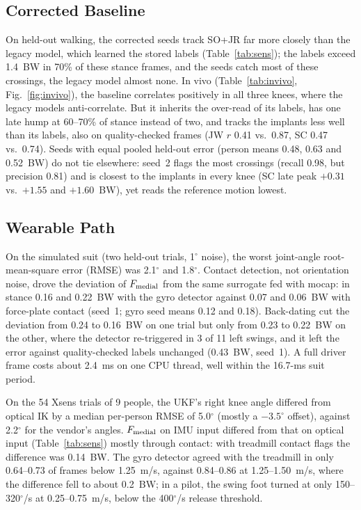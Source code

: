 \subsection{Corrected Baseline}\label{sec:res-corrected}
On held-out walking, the corrected seeds track SO+JR far more closely than the legacy model, which
learned the stored labels (Table~\ref{tab:sens}); the labels exceed 1.4~BW in 70\% of these
stance frames, and the seeds catch most of these crossings, the legacy model almost none. In vivo
(Table~\ref{tab:invivo}, Fig.~\ref{fig:invivo}), the baseline correlates positively in all three
knees, where the legacy models anti-correlate. But it inherits the over-read of its labels, has
one late hump at 60--70\% of stance instead of two, and tracks the implants less well than its
labels, also on quality-checked frames (JW $r$ 0.41 vs.\ 0.87, SC 0.47 vs.\ 0.74). Seeds with
equal pooled held-out error (person means 0.48, 0.63 and 0.52~BW) do not tie elsewhere: seed~2
flags the most crossings (recall 0.98, but precision 0.81) and is closest to the implants in every
knee (SC late peak $+0.31$ vs.\ $+1.55$ and $+1.60$~BW), yet reads the reference motion lowest.

\subsection{Wearable Path}\label{sec:res-wearable}
On the simulated suit (two held-out trials, 1$^\circ$ noise), the worst joint-angle
root-mean-square error (RMSE) was 2.1$^\circ$ and 1.8$^\circ$. Contact detection, not orientation
noise, drove the deviation of $F_{\mathrm{medial}}$ from the same surrogate fed with mocap: in stance 0.16 and
0.22~BW with the gyro detector against 0.07 and 0.06~BW with force-plate contact (seed~1; gyro
seed means 0.12 and 0.18). Back-dating cut the deviation from 0.24 to 0.16~BW on one trial
but only from 0.23 to 0.22~BW on the
other, where the detector re-triggered in 3 of 11 left swings, and it left the error against
quality-checked labels unchanged (0.43~BW, seed~1). A full driver frame
costs about 2.4~ms on one CPU thread, well within the 16.7-ms suit period.

On the 54 Xsens trials of 9 people, the UKF's right knee angle differed from optical IK by a median
per-person RMSE of 5.0$^\circ$ (mostly a $-3.5^\circ$ offset), against 2.2$^\circ$ for the vendor's
angles. $F_{\mathrm{medial}}$ on IMU input differed from that on optical input (Table~\ref{tab:sens})
mostly through contact: with treadmill contact flags the difference was
0.14~BW. The gyro detector agreed with the treadmill in only 0.64--0.73 of frames below 1.25~m/s,
against 0.84--0.86 at 1.25--1.50~m/s, where the difference fell to about 0.2~BW; in a pilot, the
swing foot turned at only 150--320$^\circ$/s at 0.25--0.75~m/s, below the 400$^\circ$/s release
threshold.
